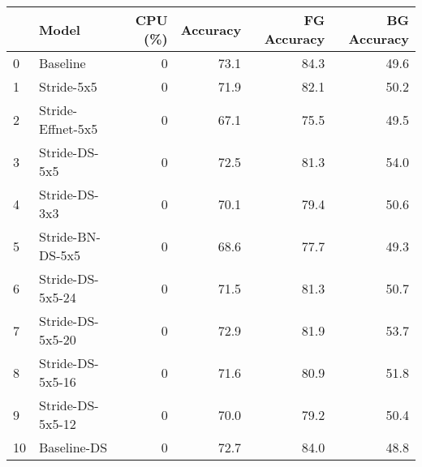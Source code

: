 \begin{tabular}{llrrrr}
\toprule
{} &              Model &  CPU (\%) &  Accuracy &  FG Accuracy &  BG Accuracy \\
\midrule
0  &           Baseline &        0 &      73.1 &         84.3 &         49.6 \\
1  &         Stride-5x5 &        0 &      71.9 &         82.1 &         50.2 \\
2  &  Stride-Effnet-5x5 &        0 &      67.1 &         75.5 &         49.5 \\
3  &      Stride-DS-5x5 &        0 &      72.5 &         81.3 &         54.0 \\
4  &      Stride-DS-3x3 &        0 &      70.1 &         79.4 &         50.6 \\
5  &   Stride-BN-DS-5x5 &        0 &      68.6 &         77.7 &         49.3 \\
6  &   Stride-DS-5x5-24 &        0 &      71.5 &         81.3 &         50.7 \\
7  &   Stride-DS-5x5-20 &        0 &      72.9 &         81.9 &         53.7 \\
8  &   Stride-DS-5x5-16 &        0 &      71.6 &         80.9 &         51.8 \\
9  &   Stride-DS-5x5-12 &        0 &      70.0 &         79.2 &         50.4 \\
10 &        Baseline-DS &        0 &      72.7 &         84.0 &         48.8 \\
\bottomrule
\end{tabular}
